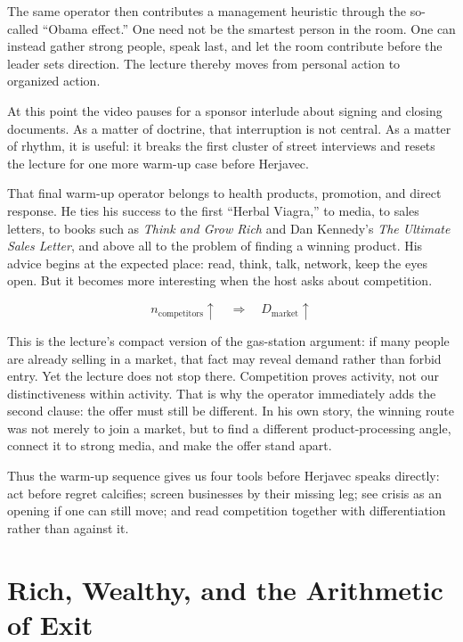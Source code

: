 The same operator then contributes a management heuristic through the so-called ``Obama effect.'' One need not be the smartest person in the room. One can instead gather strong people, speak last, and let the room contribute before the leader sets direction. The lecture thereby moves from personal action to organized action.

At this point the video pauses for a sponsor interlude about signing and closing documents. As a matter of doctrine, that interruption is not central. As a matter of rhythm, it is useful: it breaks the first cluster of street interviews and resets the lecture for one more warm-up case before Herjavec.

That final warm-up operator belongs to health products, promotion, and direct response. He ties his success to the first ``Herbal Viagra,'' to media, to sales letters, to books such as \textit{Think and Grow Rich} and Dan Kennedy's \textit{The Ultimate Sales Letter}, and above all to the problem of finding a winning product. His advice begins at the expected place: read, think, talk, network, keep the eyes open. But it becomes more interesting when the host asks about competition.

\begin{equation}
n_{\mathrm{competitors}} \uparrow
\quad \Rightarrow \quad
D_{\mathrm{market}} \uparrow
\end{equation}

This is the lecture's compact version of the gas-station argument: if many people are already selling in a market, that fact may reveal demand rather than forbid entry. Yet the lecture does not stop there. Competition proves activity, not our distinctiveness within activity. That is why the operator immediately adds the second clause: the offer must still be different. In his own story, the winning route was not merely to join a market, but to find a different product-processing angle, connect it to strong media, and make the offer stand apart.

Thus the warm-up sequence gives us four tools before Herjavec speaks directly: act before regret calcifies; screen businesses by their missing leg; see crisis as an opening if one can still move; and read competition together with differentiation rather than against it.

\section{Rich, Wealthy, and the Arithmetic of Exit}

